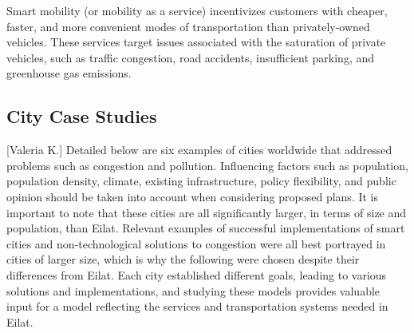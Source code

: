 \documentclass[12pt]{article}                               %
\begin{document}
Smart mobility (or mobility as a service) incentivizes customers with cheaper, faster, and more convenient modes of transportation than privately-owned vehicles. These services target issues associated with the saturation of private vehicles, such as traffic congestion, road accidents, insufficient parking, and greenhouse gas emissions.

\subsection{City Case Studies}[Valeria K.]
Detailed below are six examples of cities worldwide that addressed problems such as congestion and pollution. Influencing factors such as population, population density, climate, existing infrastructure, policy flexibility, and public opinion should be taken into account when considering proposed plans. It is important to note that these cities are all significantly larger, in terms of size and population, than Eilat. Relevant examples of successful implementations of smart cities and non-technological solutions to congestion were all best portrayed in cities of larger size, which is why the following were chosen despite their differences from Eilat. Each city established different goals, leading to various solutions and implementations, and studying these models provides valuable input for a model reflecting the services and transportation systems needed in Eilat.
\end{document}
